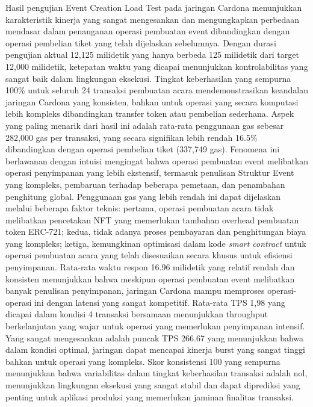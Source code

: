 Hasil pengujian Event Creation Load Test pada jaringan Cardona menunjukkan karakteristik kinerja yang sangat mengesankan dan mengungkapkan perbedaan mendasar dalam penanganan operasi pembuatan event dibandingkan dengan operasi pembelian tiket yang telah dijelaskan sebelumnya. Dengan durasi pengujian aktual 12,125 milidetik yang hanya berbeda 125 milidetik dari target 12,000 milidetik, ketepatan waktu yang dicapai menunjukkan kontrolabilitas yang sangat baik dalam lingkungan eksekusi. Tingkat keberhasilan yang sempurna 100\% untuk seluruh 24 transaksi pembuatan acara mendemonstrasikan keandalan jaringan Cardona yang konsisten, bahkan untuk operasi yang secara komputasi lebih kompleks dibandingkan transfer token atau pembelian sederhana. Aspek yang paling menarik dari hasil ini adalah rata-rata penggunaan gas sebesar 282,000 gas per transaksi, yang secara signifikan lebih rendah 16.5\% dibandingkan dengan operasi pembelian tiket (337,749 gas). Fenomena ini berlawanan dengan intuisi mengingat bahwa operasi pembuatan event melibatkan operasi penyimpanan yang lebih ekstensif, termasuk penulisan Struktur Event yang kompleks, pembaruan terhadap beberapa pemetaan, dan penambahan penghitung global. Penggunaan gas yang lebih rendah ini dapat dijelaskan melalui beberapa faktor teknis: pertama, operasi pembuatan acara tidak melibatkan pencetakan NFT yang memerlukan tambahan overhead pembuatan token ERC-721; kedua, tidak adanya proses pembayaran dan penghitungan biaya yang kompleks; ketiga, kemungkinan optimisasi dalam kode \emph{smart contract} untuk operasi pembuatan acara yang telah disesuaikan secara khusus untuk efisiensi penyimpanan. Rata-rata waktu respon 16.96 milidetik yang relatif rendah dan konsisten menunjukkan bahwa meskipun operasi pembuatan event melibatkan banyak penulisan penyimpanan, jaringan Cardona mampu memproses operasi-operasi ini dengan latensi yang sangat kompetitif. Rata-rata TPS 1,98 yang dicapai dalam kondisi 4 transaksi bersamaan menunjukkan throughput berkelanjutan yang wajar untuk operasi yang memerlukan penyimpanan intensif. Yang sangat mengesankan adalah puncak TPS 266.67 yang menunjukkan bahwa dalam kondisi optimal, jaringan dapat mencapai kinerja burst yang sangat tinggi bahkan untuk operasi yang kompleks. Skor konsistensi 100 yang sempurna menunjukkan bahwa variabilitas dalam tingkat keberhasilan transaksi adalah nol, menunjukkan lingkungan eksekusi yang sangat stabil dan dapat diprediksi yang penting untuk aplikasi produksi yang memerlukan jaminan finalitas transaksi.


